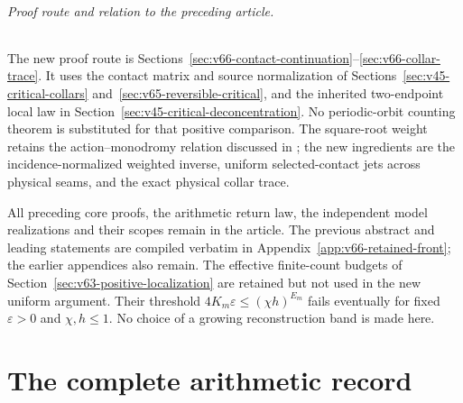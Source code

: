 \documentclass[11pt,reqno]{amsart}
\numberwithin{equation}{section}
\theoremstyle{definition}\newtheorem{definition}[theorem]{Definition}
\theoremstyle{remark}\newtheorem{remark}[theorem]{Remark}
\begin{document}
\paragraph{Proof route and relation to the preceding article.}
The new proof route is
Sections~\ref{sec:v66-contact-continuation}--\ref{sec:v66-collar-trace}.
It uses the contact matrix and source normalization of
Sections~\ref{sec:v45-critical-collars} and~\ref{sec:v65-reversible-critical},
and the inherited two-endpoint local law in
Section~\ref{sec:v45-critical-deconcentration}. No periodic-orbit
counting theorem is substituted for that positive comparison. The
square-root weight retains the action--monodromy relation discussed
in \cite{BT65}; the new ingredients are the incidence-normalized
weighted inverse, uniform selected-contact jets across physical seams,
and the exact physical collar trace.

All preceding core proofs, the arithmetic return law, the independent
model realizations and their scopes remain in the article. The previous
abstract and leading statements are compiled verbatim in
Appendix~\ref{app:v66-retained-front}; the earlier appendices also remain.
The effective finite-count budgets of
Section~\ref{sec:v63-positive-localization} are retained but not used in
the new uniform argument. Their threshold
$4K_m\varepsilon\le(\chi h)^{E_m}$ fails eventually for fixed
$\varepsilon>0$ and $\chi,h\le1$. No choice of a growing reconstruction
band is made here.

\part{The complete arithmetic record}






















\end{document}
